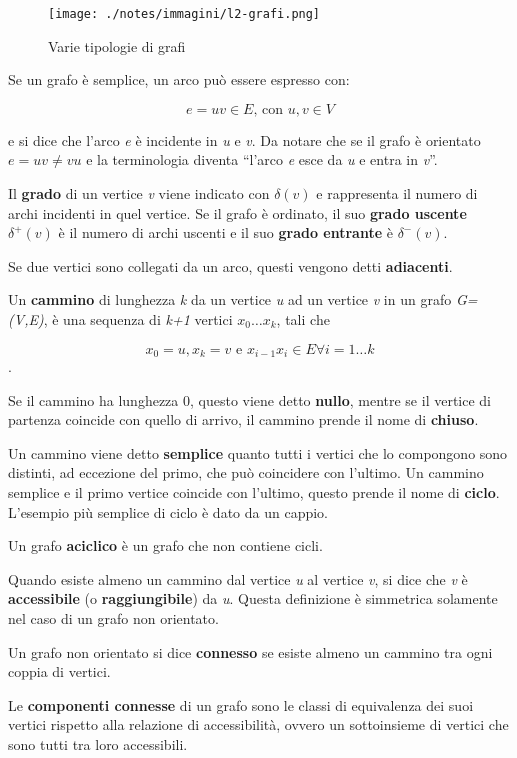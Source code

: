 \begin{figure}[htbp]
\centering
\texttt{[image: ./notes/immagini/l2-grafi.png]}
\caption{Varie tipologie di grafi}
\end{figure}

Se un grafo è semplice, un arco può essere espresso con:

$$
e = uv \in E \text{, con } u,v \in V
$$

e si dice che l'arco \emph{e} è incidente in \emph{u} e \emph{v}. Da
notare che se il grafo è orientato
$e = uv \neq vu$ e la terminologia diventa
``l'arco \emph{e} esce da \emph{u} e entra in \emph{v}''.

Il \textbf{grado} di un vertice \emph{v} viene indicato con $\delta(v)$ e rappresenta il numero di archi incidenti in quel
vertice. Se il grafo è ordinato, il suo \textbf{grado uscente} $\delta^+(v)$ è il numero di archi uscenti e il suo \textbf{grado entrante} è $\delta^-(v)$.

Se due vertici sono collegati da un arco, questi vengono detti
\textbf{adiacenti}.

Un \textbf{cammino} di lunghezza \emph{k} da un vertice \emph{u} ad un
vertice \emph{v} in un grafo \emph{G=(V,E)}, è una sequenza di
\emph{k+1} vertici $x_0 \ldots x_k$, tali che 

$$x_0 = u, x_k = v \text{ e } x_{i-1}x_i \in E \forall i = 1\ldots k $$.

Se il cammino ha lunghezza 0, questo viene detto \textbf{nullo}, mentre
se il vertice di partenza coincide con quello di arrivo, il cammino
prende il nome di \textbf{chiuso}.

Un cammino viene detto \textbf{semplice} quanto tutti i vertici che lo
compongono sono distinti, ad eccezione del primo, che può coincidere
con l'ultimo. Un cammino semplice e il primo vertice coincide con
l'ultimo, questo prende il nome di \textbf{ciclo}. L'esempio più
semplice di ciclo è dato da un cappio.

Un grafo \textbf{aciclico} è un grafo che non contiene cicli.

Quando esiste almeno un cammino dal vertice \emph{u} al vertice
\emph{v}, si dice che \emph{v} è \textbf{accessibile} (o
\textbf{raggiungibile}) da \emph{u}. Questa definizione è simmetrica
solamente nel caso di un grafo non orientato.

Un grafo non orientato si dice \textbf{connesso} se esiste almeno un
cammino tra ogni coppia di vertici.

Le \textbf{componenti connesse} di un grafo sono le classi di
equivalenza dei suoi vertici rispetto alla relazione di accessibilità,
ovvero un sottoinsieme di vertici che sono tutti tra loro accessibili.

